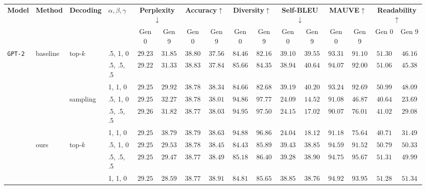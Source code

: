 \setlength{\tabcolsep}{1.8pt}
\begin{table*}[t]
    \centering
    \small
    \begin{tabular}{llllcccccccccccc}
        \toprule
        \multirow{2}{*}{\bf Model} & \multirow{2}{*}{\bf Method} & \multirow{2}{*}{\bf Decoding} & \multirow{2}{*}{$\alpha,\beta,\gamma$} & \multicolumn{2}{c}{\bf Perplexity$\downarrow$} & \multicolumn{2}{c}{\bf Accuracy$\uparrow$} & \multicolumn{2}{c}{\bf Diversity$\uparrow$} & \multicolumn{2}{c}{\bf Self-BLEU$\downarrow$} & \multicolumn{2}{c}{\bf MAUVE$\uparrow$} & \multicolumn{2}{c}{\bf Readability$\uparrow$} \\
        & & & & Gen 0 & Gen 9 & Gen 0 & Gen 9 & Gen 0 & Gen 9 & Gen 0 & Gen 9 & Gen 0 & Gen 9 & Gen 0 & Gen 9 \\
        \midrule
        \multirow{12}{*}{\texttt{GPT-2}} 
        & \multirow{6}{*}{baseline}
        & \multirow{3}{*}{top-$k$} 
            & .5, 1, 0 & $29.23$ & $31.85$ & $38.80$ & $37.56$ & $84.46$ & $82.16$ & $39.10$ & $39.55$ & $93.31$ & $91.10$ & $51.30$ & $46.16$ \\
        & & & .5, .5, .5 & $29.22$ & $31.33$ & $38.83$ & $37.84$ & $85.66$ & $84.35$ & $38.94$ & $40.64$ & $94.07$ & $92.00$ & $51.06$ & $45.38$ \\
        & & & 1, 1, 0 & $29.25$ & $29.92$ & $38.78$ & $38.34$ & $84.66$ & $82.68$ & $39.19$ & $40.20$ & $93.24$ & $92.69$ & $50.99$ & $48.09$ \\
        \cmidrule{3-16}
        & & \multirow{3}{*}{sampling} 
            & .5, 1, 0 & $29.25$ & $32.27$ & $38.78$ & $38.01$ & $94.86$ & $97.77$ & $24.09$ & $14.52$ & $91.08$ & $46.87$ & $40.64$ & $23.69$ \\
        & & & .5, .5, .5 & $29.26$ & $31.82$ & $38.77$ & $38.03$ & $94.95$ & $97.50$ & $24.15$ & $17.02$ & $90.07$ & $76.01$ & $41.02$ & $29.08$ \\
        & & & 1, 1, 0 & $29.25$ & $38.79$ & $38.79$ & $38.63$ & $94.88$ & $96.86$ & $24.04$ & $18.12$ & $91.18$ & $75.64$ & $40.71$ & $31.49$ \\
        \cmidrule{2-16}
        & \multirow{6}{*}{ours}
        & \multirow{3}{*}{top-$k$} 
            & .5, 1, 0 & $29.25$ & $29.53$ & $38.78$ & $38.45$ & $84.43$ & $85.89$ & $39.43$ & $38.85$ & $94.59$ & $91.52$ & $50.79$ & $50.33$ \\
        & & & .5, .5, .5 & $29.25$ & $29.47$ & $38.77$ & $38.49$ & $85.18$ & $86.40$ & $39.28$ & $38.90$ & $94.75$ & $95.67$ & $51.31$ & $49.99$ \\
        & & & 1, 1, 0 & $29.25$ & $28.59$ & $38.77$ & $38.91$ & $84.81$ & $85.65$ & $38.85$ & $38.76$ & $94.92$ & $93.95$ & $51.28$ & $51.34$ \\

\end{tabular}
\end{table*}
